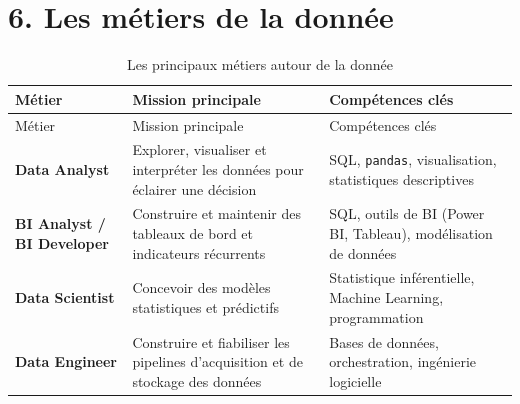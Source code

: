 \documentclass[
  french,
  letterpaper,
  open=any]{scrbook}
\theoremstyle{definition}
\theoremstyle{definition}
\theoremstyle{remark}
\begin{document}
\section{6. Les métiers de la
donnée}\label{les-muxe9tiers-de-la-donnuxe9e}

\begin{longtable}[]{@{}
  >{\raggedright\arraybackslash}p{}
  >{\raggedright\arraybackslash}p{}
  >{\raggedright\arraybackslash}p{}@{}}
\caption{Les principaux métiers autour de la
donnée}\label{tbl-metiers-donnee}\tabularnewline
\toprule\noalign{}
\begin{minipage}[b]{\linewidth}\raggedright
Métier
\end{minipage} & \begin{minipage}[b]{\linewidth}\raggedright
Mission principale
\end{minipage} & \begin{minipage}[b]{\linewidth}\raggedright
Compétences clés
\end{minipage} \\
\midrule\noalign{}
\endfirsthead
\toprule\noalign{}
\begin{minipage}[b]{\linewidth}\raggedright
Métier
\end{minipage} & \begin{minipage}[b]{\linewidth}\raggedright
Mission principale
\end{minipage} & \begin{minipage}[b]{\linewidth}\raggedright
Compétences clés
\end{minipage} \\
\midrule\noalign{}
\endhead
\bottomrule\noalign{}
\endlastfoot
\textbf{Data Analyst} & Explorer, visualiser et interpréter les données
pour éclairer une décision & SQL, \texttt{pandas}, visualisation,
statistiques descriptives \\
\textbf{BI Analyst / BI Developer} & Construire et maintenir des
tableaux de bord et indicateurs récurrents & SQL, outils de BI (Power
BI, Tableau), modélisation de données \\
\textbf{Data Scientist} & Concevoir des modèles statistiques et
prédictifs & Statistique inférentielle, Machine Learning,
programmation \\
\textbf{Data Engineer} & Construire et fiabiliser les pipelines
d'acquisition et de stockage des données & Bases de données,
orchestration, ingénierie logicielle \\
\end{longtable}
\end{document}
